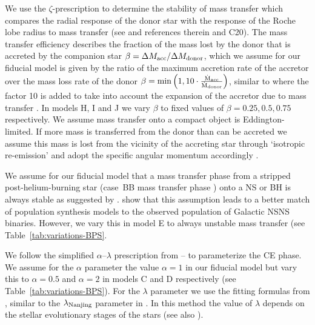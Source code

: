 \documentclass[twocolumn]{aastex63}
\newcommand{\CMP}{C20}
\begin{document}
We use the $\zeta$-prescription to determine the stability of mass transfer which compares the radial response of the donor star with the response of the Roche lobe radius to mass transfer (see \citealt[][]{2018MNRAS.481.4009V,2020arXiv200300195V} and references therein and \CMP). 
The mass transfer efficiency describes the fraction of the mass lost by the donor that is accreted by the companion star $\beta = \Delta M_{\rm{acc}} / \Delta M_{\rm{donor}}$,  which we assume for our fiducial model is given by  the ratio of the maximum accretion rate of the accretor over the mass loss rate of the donor
$\beta = \rm{min} \left(1, 10 \cdot \frac{\dot{M}_{\rm{acc}}}{\dot{M}_{\rm{donor}}}  \right)$, similar to \citet{2002MNRAS.329..897H} where the factor 10 is added to take into account the expansion of the accretor due to mass transfer \citep{1972AcA....22...73P,2002MNRAS.329..897H}.
In  models H, I and J we vary $\beta$ to fixed values of $\beta = 0.25, 0.5, 0.75$ respectively. 
We assume mass transfer onto a compact object is Eddington-limited.  
If more mass is transferred from the donor than can be accreted we assume this mass is lost from the vicinity of the accreting star  through  `isotropic re-emission'  \citep[e.g.][]{1991PhR...203....1B,1997A&A...327..620S, 2006csxs.book..623T,1975MmSAI..46..217M} and adopt the specific angular momentum accordingly  \citep[c.f. e.g.][]{2008ApJS..174..223B}.  


We assume for our fiducial model that a mass transfer phase from a stripped post-helium-burning star (case~BB mass transfer phase \citealt{1981A&A....96..142D, 1993ARep...37..411T}) onto a \ac{NS} or \ac{BH} is always stable as suggested by  \citet{2015MNRAS.451.2123T,2017ApJ...846..170T}. 
\citet{2018MNRAS.481.4009V} show that this assumption leads to a better match of population synthesis models to the observed population of  Galactic \ac{NSNS} binaries.  However, we vary this in model E to always unstable mass transfer (see Table~\ref{tab:variations-BPS}.



We follow the simplified $\alpha$--$\lambda$ prescription from \citet{1984ApJ...277..355W}--\citet{1990ApJ...358..189D} to parameterize the \ac{CE} phase. 
We assume for the $\alpha$ parameter the value $\alpha=1$ in our fiducial model but vary this to $\alpha = 0.5$ and $\alpha=2$ in models C and D respectively (see Table~\ref{tab:variations-BPS}). For the $\lambda$ parameter we use the fitting formulas from \citet{2010ApJ...716..114X,2010ApJ...722.1985X},  similar to the $\lambda_{\rm{Nanjing}}$ parameter in \citet{2012ApJ...759...52D}. In this method the value of $\lambda$  depends on the stellar evolutionary stages of the stars (see also \citealt{2000A&A...360.1043D,2001ASPC..229..255D,2001A&A...369..170T,2016A&A...596A..58K}).
\end{document}
